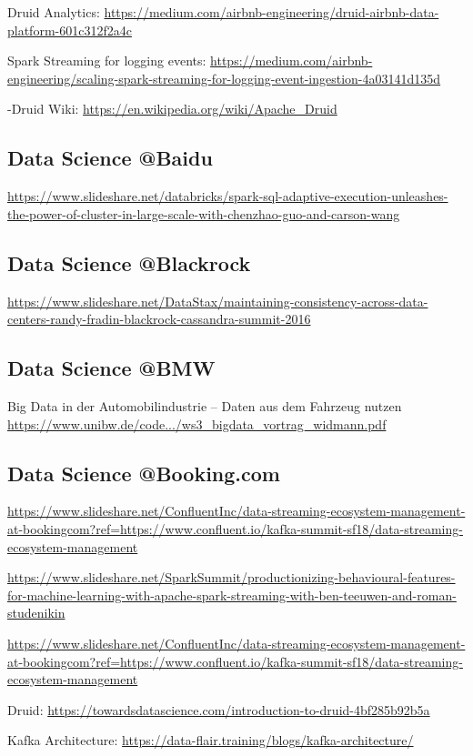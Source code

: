 \documentclass[12pt]{scrartcl} %
\begin{document}
Druid Analytics:
\url{https://medium.com/airbnb-engineering/druid-airbnb-data-platform-601c312f2a4c}

Spark Streaming for logging events:
\url{https://medium.com/airbnb-engineering/scaling-spark-streaming-for-logging-event-ingestion-4a03141d135d}

-Druid Wiki:
\url{https://en.wikipedia.org/wiki/Apache_Druid}


\subsection{Data Science @Baidu}
\url{https://www.slideshare.net/databricks/spark-sql-adaptive-execution-unleashes-the-power-of-cluster-in-large-scale-with-chenzhao-guo-and-carson-wang}

\subsection{Data Science @Blackrock}
\url{https://www.slideshare.net/DataStax/maintaining-consistency-across-data-centers-randy-fradin-blackrock-cassandra-summit-2016}

\subsection{Data Science @BMW}
Big Data in der Automobilindustrie – Daten aus dem Fahrzeug nutzen \url{https://www.unibw.de/code.../ws3_bigdata_vortrag_widmann.pdf}

\subsection{Data Science @Booking.com}
\url{https://www.slideshare.net/ConfluentInc/data-streaming-ecosystem-management-at-bookingcom?ref=https://www.confluent.io/kafka-summit-sf18/data-streaming-ecosystem-management}

\url{https://www.slideshare.net/SparkSummit/productionizing-behavioural-features-for-machine-learning-with-apache-spark-streaming-with-ben-teeuwen-and-roman-studenikin}

\url{https://www.slideshare.net/ConfluentInc/data-streaming-ecosystem-management-at-bookingcom?ref=https://www.confluent.io/kafka-summit-sf18/data-streaming-ecosystem-management}

Druid:
\url{https://towardsdatascience.com/introduction-to-druid-4bf285b92b5a}

Kafka Architecture:
\url{https://data-flair.training/blogs/kafka-architecture/}
\end{document}
